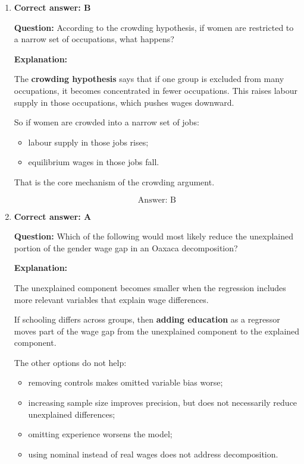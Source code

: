 \documentclass[12pt]{article}
\begin{document}
\begin{enumerate}[label=\textbf{\arabic*.}]
This differs from:
\begin{itemize}
    \item \textbf{taste-based discrimination}, where employers simply dislike hiring women;
    \item \textbf{human capital investment}, which concerns education and training decisions;
    \item \textbf{comparable worth}, which is a policy concept.
\end{itemize}

\[
\boxed{\text{Answer: C}}
\]

\item \textbf{Correct answer: B}

\textbf{Question:} According to the crowding hypothesis, if women are restricted to a narrow set of occupations, what happens?

\textbf{Explanation:}

The \textbf{crowding hypothesis} says that if one group is excluded from many occupations, it becomes concentrated in fewer occupations. This raises labour supply in those occupations, which pushes wages downward.

So if women are crowded into a narrow set of jobs:

\begin{itemize}
    \item labour supply in those jobs rises;
    \item equilibrium wages in those jobs fall.
\end{itemize}

That is the core mechanism of the crowding argument.

\[
\boxed{\text{Answer: B}}
\]

\item \textbf{Correct answer: A}

\textbf{Question:} Which of the following would most likely reduce the unexplained portion of the gender wage gap in an Oaxaca decomposition?

\textbf{Explanation:}

The unexplained component becomes smaller when the regression includes more relevant variables that explain wage differences.

If schooling differs across groups, then \textbf{adding education} as a regressor moves part of the wage gap from the unexplained component to the explained component.

The other options do not help:
\begin{itemize}
    \item removing controls makes omitted variable bias worse;
    \item increasing sample size improves precision, but does not necessarily reduce unexplained differences;
    \item omitting experience worsens the model;
    \item using nominal instead of real wages does not address decomposition.
\end{itemize}


\end{enumerate}
\end{document}
